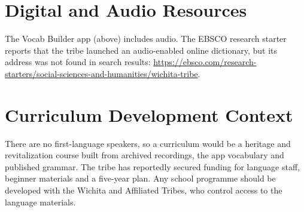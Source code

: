 \documentclass[12pt]{article}
\begin{document}
\section{Digital and Audio Resources}
The Vocab Builder app (above) includes audio. The EBSCO research starter reports that the tribe launched an audio-enabled online dictionary, but its address was not found in search results: \url{https://ebsco.com/research-starters/social-sciences-and-humanities/wichita-tribe}.

\section{Curriculum Development Context}
There are no first-language speakers, so a curriculum would be a heritage and revitalization course built from archived recordings, the app vocabulary and published grammar. The tribe has reportedly secured funding for language staff, beginner materials and a five-year plan. Any school programme should be developed with the Wichita and Affiliated Tribes, who control access to the language materials.
\end{document}
